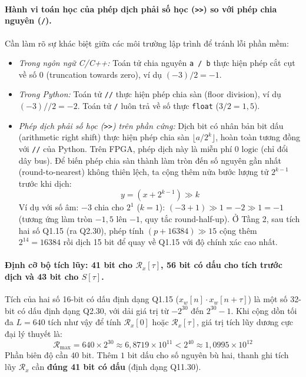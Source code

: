 \documentclass[11pt,a4paper]{article}
\begin{document}
\paragraph{Hành vi toán học của phép dịch phải số học (\texttt{>>}) so với phép chia nguyên (\texttt{/}).}
Cần làm rõ sự khác biệt giữa các môi trường lập trình để tránh lỗi phần mềm:
\begin{itemize}
    \setlength{\itemsep}{1pt}
    \item \emph{Trong ngôn ngữ C/C++:} Toán tử chia nguyên \texttt{a / b} thực hiện phép cắt cụt về số 0 (truncation towards zero), ví dụ $(-3) / 2 = -1$.
    \item \emph{Trong Python:} Toán tử \texttt{//} thực hiện phép chia sàn (floor division), ví dụ $(-3) // 2 = -2$. Toán tử \texttt{/} luôn trả về số thực \texttt{float} ($3 / 2 = 1{,}5$).
    \item \emph{Phép dịch phải số học (\texttt{>>}) trên phần cứng:} Dịch bit có nhân bản bit dấu (arithmetic right shift) thực hiện phép chia sàn $\lfloor a / 2^k \rfloor$, hoàn toàn tương đồng với \texttt{//} của Python. Trên FPGA, phép dịch này là miễn phí $0\text{ logic}$ (chỉ đổi dây bus). Để biến phép chia sàn thành làm tròn đến số nguyên gần nhất (round-to-nearest) không thiên lệch, ta cộng thêm nửa bước lượng tử $2^{k-1}$ trước khi dịch:
    \begin{equation}
    y = (x + 2^{k-1}) \gg k
    \label{eq:round_shift}
    \end{equation}
    Ví dụ với số âm: $-3$ chia cho $2^1$ ($k=1$): $(-3 + 1) \gg 1 = -2 \gg 1 = -1$ (tương ứng làm tròn $-1{,}5$ lên $-1$, quy tắc round-half-up). Ở Tầng 2, sau tích hai số Q1.15 (ra Q2.30), phép tính $(p + 16384) \gg 15$ cộng thêm $2^{14} = 16384$ rồi dịch 15 bit để quay về Q1.15 với độ chính xác cao nhất.
\end{itemize}

\paragraph{Định cỡ bộ tích lũy: 41 bit cho $\mathcal{R}_x[\tau]$, 56 bit có dấu cho tích trước dịch và 43 bit cho $S[\tau]$.}
Tích của hai số 16-bit có dấu định dạng Q1.15 ($x_w[n] \cdot x_w[n+\tau]$) là một số 32-bit có dấu định dạng Q2.30, với dải giá trị từ $-2^{30}$ đến $2^{30}-1$.
Khi cộng dồn tối đa $L = 640$ tích như vậy để tính $\mathcal{R}_x[0]$ hoặc $\mathcal{R}_x[\tau]$, giá trị tích lũy dương cực đại lý thuyết là:
\begin{equation}
\mathcal{R}_{\max} = 640 \times 2^{30} \approx 6{,}8719 \times 10^{11} < 2^{40} \approx 1{,}0995 \times 10^{12}
\end{equation}
Phần biên độ cần $40\text{ bit}$. Thêm $1\text{ bit dấu}$ cho số nguyên bù hai, thanh ghi tích lũy $\mathcal{R}_x$ cần \textbf{đúng 41 bit có dấu} (định dạng Q11.30).
\end{document}
